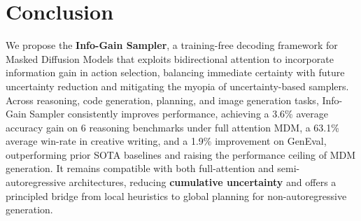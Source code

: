\section{Conclusion}

We propose the \textbf{Info-Gain Sampler}, a training-free decoding framework for Masked Diffusion Models that exploits bidirectional attention to incorporate information gain in action selection, balancing immediate certainty with future uncertainty reduction and mitigating the myopia of uncertainty-based samplers. Across reasoning, code generation, planning, and image generation tasks, Info-Gain Sampler consistently improves performance, achieving a 3.6\% average accuracy gain on 6 reasoning benchmarks under full attention MDM, a 63.1\% average win-rate in creative writing, and a 1.9\% improvement on GenEval, outperforming prior SOTA baselines and raising the performance ceiling of MDM generation. It remains compatible with both full-attention and semi-autoregressive architectures, reducing \textbf{cumulative uncertainty} and offers a principled bridge from local heuristics to global planning for non-autoregressive generation.
